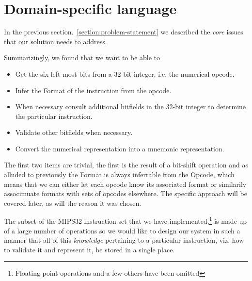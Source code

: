 \section{Domain-specific language}

In the previous section.~\ref{section:problem-statement} we described
the \emph{core} issues that our solution needs to address. 

Summarizingly, we found that we want to be able to

\begin{itemize}
\item Get the six left-most bits from a 32-bit integer,
  i.e. the numerical opcode.
\item Infer the Format of the instruction from the opcode.
\item When necessary consult additional bitfields in the 32-bit integer to
      determine the particular instruction.
\item Validate other bitfields when necessary.
\item Convert the numerical representation into a mnemonic representation.
\end{itemize}

The first two items are trivial, the first is the result of a
bit-shift operation and as alluded to previously the Format is always
inferrable from the Opcode, which means that we can either let each
opcode know its associated format or similarily associmuate formats with
sets of opcodes elsewhere. The specific approach will be covered
later, as will the reason it was chosen.

The subset of the MIPS32-instruction set that we have
implemented,\footnote{Floating point operations and a few others have
  been omitted} is made up of a large number of operations so we would
like to design our system in such a manner that all of this
\emph{knowledge} pertaining to a particular instruction, viz. how to
validate it and represent it, be stored in a single place.


